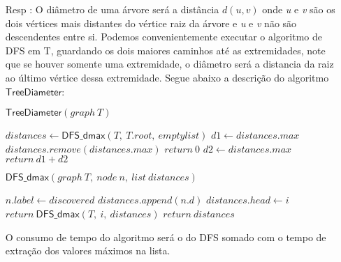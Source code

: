 \documentclass{homework}
\begin{document}
    \begin{enumerate}
        \item[Resp :] O diâmetro de uma árvore será a distância $d(u,v)$ onde \textit{u} e \textit{v} são os dois vértices mais distantes do vértice raiz da árvore e \textit{u} e \textit{v} não são descendentes entre si. Podemos convenientemente executar o algoritmo de DFS em T, guardando os dois maiores caminhos até as extremidades, note que se houver somente uma extremidade, o diâmetro será a distancia da raiz ao último vértice dessa extremidade. Segue abaixo a descrição do algoritmo $\mathsf{TreeDiameter}$:
        
\pagebreak

        $\mathsf{TreeDiameter}(graph\ T)$
			\begin{algorithmic}[1]
			    \State $distances \gets \mathsf{DFS\_dmax}(T,\ T.root,\ emptylist)$
			    \State $d1 \gets distances.max$
			    \State $distances.remove(distances.max)$
			        \State $return\ 0$
			    \EndIf
			    \State $d2 \gets distances.max$
			    \State $return\ d1+d2$
			\end{algorithmic}
		$\mathsf{DFS\_dmax}(graph\ T,\ node\ n,\ list\ distances)$
			\begin{algorithmic}[1]
			    \State $n.label \gets discovered$
			    \State $distances.append(n.d)$
			                \State $distances.head \gets i$
			            \EndIf
			            \State $return\ \mathsf{DFS\_dmax}(T,\ i,\ distances)$
			        \EndIf
			    \EndFor
			    \State $return\ distances$
			\end{algorithmic}
			O consumo de tempo do algoritmo será o do DFS somado com o tempo de extração dos valores máximos na lista.
    \end{enumerate}
\end{document}
